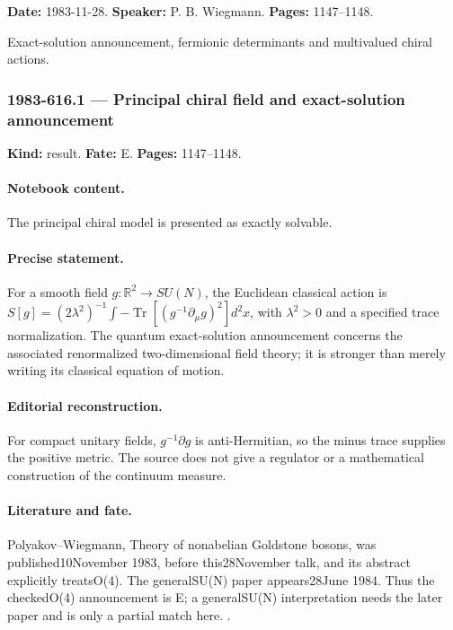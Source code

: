 \noindent\textbf{Date:} 1983-11-28. \textbf{Speaker:} P. B. Wiegmann. \textbf{Pages:} 1147--1148.\par

Exact-solution announcement, fermionic determinants and multivalued chiral actions.

\subsubsection{1983-616.1 --- Principal chiral field and exact-solution announcement}

\label{item:1983-616.1}

\noindent\textbf{Kind:} result. \textbf{Fate:} E. \textbf{Pages:} 1147--1148.\par

\paragraph{Notebook content.} The principal chiral model is presented as exactly solvable.

\paragraph{Precise statement.} For a smooth field $g:\mathbb R^2\to SU(N)$, the Euclidean classical action is $S[g]=(2\lambda^2)^{-1}\int-\operatorname{Tr}[(g^{-1}\partial_\mu g)^2]d^2x$, with $\lambda^2>0$ and a specified trace normalization. The quantum exact-solution announcement concerns the associated renormalized two-dimensional field theory; it is stronger than merely writing its classical equation of motion.

\paragraph{Editorial reconstruction.} For compact unitary fields, $g^{-1}\partial g$ is anti-Hermitian, so the minus trace supplies the positive metric. The source does not give a regulator or a mathematical construction of the continuum measure.

\paragraph{Literature and fate.} Polyakov--Wiegmann, Theory of nonabelian Goldstone bosons, was published10November 1983, before this28November talk, and its abstract explicitly treatsO(4). The generalSU(N) paper appears28June 1984. Thus the checkedO(4) announcement is E; a generalSU(N) interpretation needs the later paper and is only a partial match here. \citep{polyakovwiegmann1983goldstone,wiegmann1984sun}.

